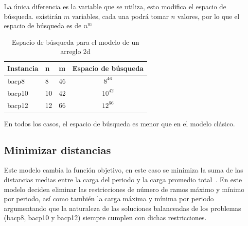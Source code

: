 \documentclass[letterpaper,10pt]{article}
\begin{document}
La única diferencia es la variable que se utiliza, esto modifica el espacio de búsqueda. existirán $m$ variables, cada una podrá tomar $n$ valores, por lo que el espacio de búsqueda es de $n^m$

\begin{table}[H]
  \centering
  \begin{tabular}{@{}lllc@{}}
    \toprule[1pt]
    Instancia & n & m & Espacio de búsqueda\\
    \midrule
    bacp8 & 8 & 46 & $8^{46}$ \\
    bacp10 & 10 & 42 & $10^{42}$ \\
    bacp12 & 12 & 66 & $12^{66}$ \\
    \bottomrule
  \end{tabular}
  \caption{Espacio de búsqueda para el modelo de un arreglo 2d}
\end{table}

En todos los casos, el espacio de búsqueda es menor que en el modelo clásico.

\subsection{Minimizar distancias}

Este modelo cambia la función objetivo, en este caso se minimiza la suma de las distancias medias entre la carga del periodo y la carga promedio total~\cite{Monette07acp}. En este modelo deciden eliminar las restricciones de número de ramos máximo y mínimo por periodo, así como también la carga máxima y mínima por periodo argumentando que la naturaleza de las soluciones balanceadas de los problemas (bacp8, bacp10 y bacp12) siempre cumplen con dichas restricciones.
\end{document}
